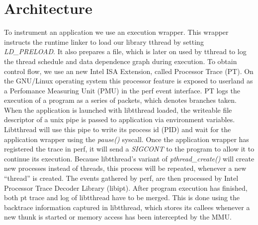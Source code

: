 \section{Architecture}
\label{sec:introduction}

To instrument an application we use an execution wrapper. This wrapper instructs
the runtime linker to load our library tthread by setting \emph{LD\_PRELOAD}. It
also prepares a file, which is later on used by tthread to log the thread
schedule and data dependence graph during execution. To obtain control flow, we
use an new Intel ISA Extension, called Processor Trace (PT). On the GNU/Linux
operating system this processor feature is exposed to userland as a Perfomance
Measuring Unit (PMU) in the perf event interface. PT logs the execution of a
program as a series of packets, which denotes branches taken.  When the
application is launched with libtthread loaded, the writeable file descriptor of
a unix pipe is passed to application via environment variables.  Libtthread will
use this pipe to write its process id (PID) and wait for the application wrapper using
the \emph{pause()} syscall. Once the application wrapper has registered the
trace in perf, it will send a \emph{SIGCONT} to the program to allow it to
continue its execution. Because libtthread's variant of \emph{pthread\_create()}
will create new processes instead of threads, this process will be repeated,
whenever a new "`thread"' is created.  The events gathered by perf, are then
processed by Intel Processor Trace Decoder Library (libipt). After program
execution has finished, both pt trace and log of libtthread have to be merged.
This is done using the backtrace information captured in libtthread, which
stores its callees whenever a new thunk is started or memory access has been
intercepted by the MMU.
